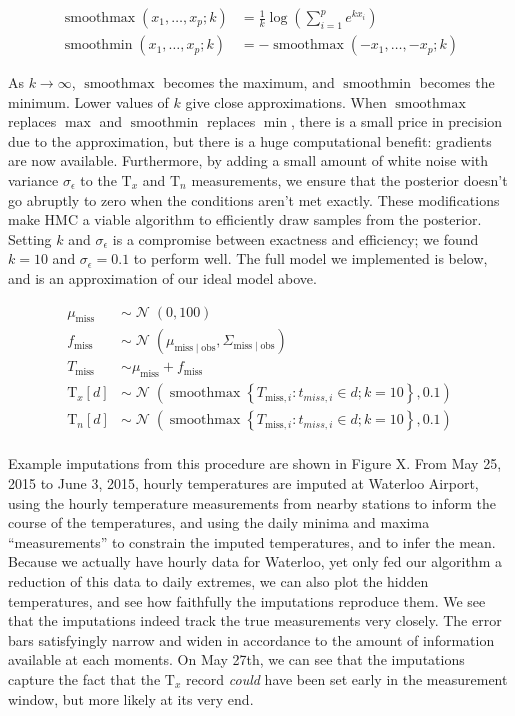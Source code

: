 \documentclass[letter]{article}
\newcommand{\genericdel}[3]{%
      \left#1#3\right#2
    }
\newcommand{\del}[1]{\genericdel(){#1}}
\newcommand{\sbr}[1]{\genericdel[]{#1}}
\newcommand{\cbr}[1]{\genericdel\{\}{#1}}
\DeclareMathOperator{\normal}{\mathcal{N}}
\newcommand{\T}{\mathrm{T}}
\newcommand{\Tn}{\T_{n}}
\newcommand{\Tx}{\T_{x}}
\newcommand{\miss}{\mathrm{miss}}
\newcommand{\obs}{\mathrm{obs}}
\DeclareMathOperator{\softmax}{smoothmax}
\DeclareMathOperator{\softmin}{smoothmin}
\begin{document}
\begin{align}
    \softmax\del{x_1, \ldots, x_p ; k} &= \frac{1}{k} \log\del{\sum_{i=1}^p e^{kx_i}} \\
    \softmin\del{x_1, \ldots, x_p ; k} &= -\softmax\del{-x_1, \ldots, -x_p; k}
\end{align}

As \(k \rightarrow \infty\), \(\softmax\) becomes the maximum, and
\(\softmin\) becomes the minimum. Lower values of \(k\) give close
approximations. When \(\softmax\) replaces \(\max\) and \(\softmin\)
replaces \(\min\), there is a small price in precision due to the
approximation, but there is a huge computational benefit: gradients are
now available. Furthermore, by adding a small amount of white noise with
variance \(\sigma_\epsilon\) to the \(\Tx\) and \(\Tn\) measurements, we
ensure that the posterior doesn't go abruptly to zero when the
conditions aren't met exactly. These modifications make HMC a viable
algorithm to efficiently draw samples from the posterior. Setting \(k\)
and \(\sigma_\epsilon\) is a compromise between exactness and
efficiency; we found \(k=10\) and \(\sigma_\epsilon=0.1\) to perform
well. The full model we implemented is below, and is an approximation of
our ideal model above.

\begin{align}
    \mu_\miss &\sim \normal\del{0,100} \\
    f_\miss &\sim \normal\del{\mu_{\miss \mid \obs}, \Sigma_{\miss \mid \obs}} \\
    T_\miss &\sim \mu_\miss + f_\miss \\
    \Tx\sbr{d} &\sim \normal\del{\softmax\cbr{ T_{\miss,i}: t_{miss,i} \in d; k=10}, 0.1} \\
    \Tn\sbr{d} &\sim \normal\del{\softmax\cbr{ T_{\miss,i}: t_{miss,i} \in d; k=10}, 0.1} \\
\end{align}

Example imputations from this procedure are shown in Figure X. From May
25, 2015 to June 3, 2015, hourly temperatures are imputed at Waterloo
Airport, using the hourly temperature measurements from nearby stations
to inform the course of the temperatures, and using the daily minima and
maxima ``measurements'' to constrain the imputed temperatures, and to
infer the mean. Because we actually have hourly data for Waterloo, yet
only fed our algorithm a reduction of this data to daily extremes, we
can also plot the hidden temperatures, and see how faithfully the
imputations reproduce them. We see that the imputations indeed track the
true measurements very closely. The error bars satisfyingly narrow and
widen in accordance to the amount of information available at each
moments. On May 27th, we can see that the imputations capture the fact
that the \(\Tx\) record \emph{could} have been set early in the
measurement window, but more likely at its very end.
    
\end{document}
